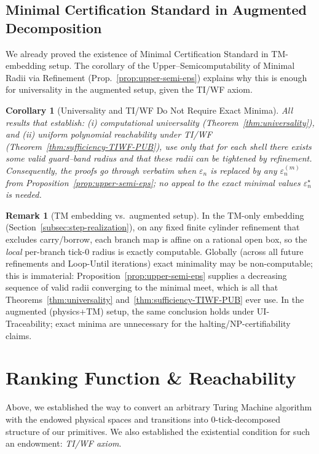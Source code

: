 \documentclass[12pt]{article}
\theoremstyle{definition}
\newtheorem{remark}{Remark}[section]
\theoremstyle{plain}
\newtheorem{corollary}{Corollary}[section]
\begin{document}
\subsection{Minimal Certification Standard in Augmented Decomposition}

We already proved the existence of Minimal Certification Standard in TM-embedding setup. The corollary of the Upper–Semicomputability of Minimal Radii via Refinement (Prop.~\ref{prop:upper-semi-eps}) explains why this is enough for universality in the augmented setup, given the TI/WF axiom.


\begin{corollary}[Universality and TI/WF Do Not Require Exact Minima]
\label{cor:universality-independent-of-exact-eps}
All results that establish: \emph{(i)} computational universality (Theorem~\ref{thm:universality}), and
\emph{(ii)} uniform polynomial reachability under TI/WF (Theorem~\ref{thm:sufficiency-TIWF-PUB}), use only that for each shell
there exists \emph{some} valid guard–band radius and that these radii can be tightened by refinement. Consequently, the proofs
go through verbatim when $\varepsilon_n$ is replaced by any $\varepsilon_n^{(m)}$ from Proposition~\ref{prop:upper-semi-eps};
no appeal to the exact minimal values $\varepsilon_n^\star$ is needed.
\end{corollary}

\begin{remark}[TM embedding vs.\ augmented setup]
In the TM-only embedding (Section~\ref{subsec:step-realization}), on any fixed finite cylinder refinement that excludes carry/borrow,
each branch map is affine on a rational open box, so the \emph{local} per-branch tick-$0$ radius is exactly computable.
Globally (across all future refinements and Loop-Until iterations) exact minimality may be non-computable; this is immaterial:
Proposition~\ref{prop:upper-semi-eps} supplies a decreasing sequence of valid radii converging to the minimal meet, which is all
that Theorems~\ref{thm:universality} and~\ref{thm:sufficiency-TIWF-PUB} ever use. In the augmented (physics+TM) setup, the same
conclusion holds under UI-Traceability; exact minima are unnecessary for the halting/NP-certifiability claims.
\end{remark}



\section{Ranking Function \& Reachability}
\label{sec:ranking-reachability}
Above, we established the way to convert an arbitrary Turing Machine algorithm with the endowed physical spaces and transitions into 0-tick-decomposed structure of our primitives. We also established the existential condition for such an endowment: \emph{TI/WF axiom}.
\end{document}

